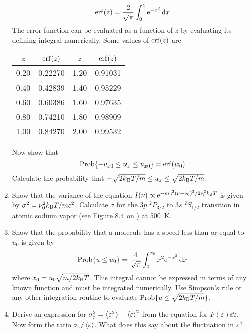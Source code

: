 \documentclass[../psets.tex]{subfiles}
\begin{document}
\begin{enumerate}[label={\textbf{27-\arabic*.}},leftmargin=3.5em]
\begin{equation*}
        \erf(z) = \frac{2}{\sqrt{\pi}}\int_0^z\e[-x^2]\dd{x}
    \end{equation*}
    The error function can be evaluated as a function of $z$ by evaluating its defining integral numerically. Some values of $\erf(z)$ are
    \begin{center}
        \small
        \renewcommand{\arraystretch}{1.4}
        \begin{tabular}{cc|cc}
            $z$ & $\erf(z)$ & $z$ & $\erf(z)$\\
            \hline
            0.20 & 0.22270 & 1.20 & 0.91031\\
            0.40 & 0.42839 & 1.40 & 0.95229\\
            0.60 & 0.60386 & 1.60 & 0.97635\\
            0.80 & 0.74210 & 1.80 & 0.98909\\
            1.00 & 0.84270 & 2.00 & 0.99532\\
        \end{tabular}
    \end{center}
    Now show that
    \begin{equation*}
        \Prob\{-u_{x0}\leq u_x\leq u_{x0}\} = \erf(w_0)
    \end{equation*}
    Calculate the probability that $-\sqrt{2\kB T/m}\leq u_x\leq\sqrt{2\kB T/m}$.
    \setcounter{enumi}{19}
    \item Show that the variance of the equation $I(\nu)\propto\e[-mc^2(\nu-\nu_0)^2/2\nu_0^2\kB T]$ is given by $\sigma^2=\nu_0^2\kB T/mc^2$. Calculate $\sigma$ for the $3p$ ${}^2P_{3/2}$ to $3s$ ${}^2S_{1/2}$ transition in atomic sodium vapor (see Figure 8.4 on \textcite[307]{bib:McQuarrieSimon}) at \SI{500}{\kelvin}.
    \setcounter{enumi}{23}
    \item Show that the probability that a molecule has a speed less than or equal to $u_0$ is given by
    \begin{equation*}
        \Prob\{u\leq u_0\} = \frac{4}{\sqrt{\pi}}\int_0^{x_0}x^2\e[-x^2]\dd{x}
    \end{equation*}
    where $x_0=u_0\sqrt{m/2\kB T}$. This integral cannot be expressed in terms of any known function and must be integrated numerically. Use Simpson's rule or any other integration routine to evaluate $\Prob\{u\leq\sqrt{2\kB T/m}\}$.
    \setcounter{enumi}{26}
    \item Derive an expression for $\sigma_\varepsilon^2=\prb{\varepsilon^2}-\prb{\varepsilon}^2$ from the equation for $F(\varepsilon)\dd{\varepsilon}$. Now form the ratio $\sigma_\varepsilon/\prb{\varepsilon}$. What does this say about the fluctuation in $\varepsilon$?

\end{enumerate}
\end{document}
